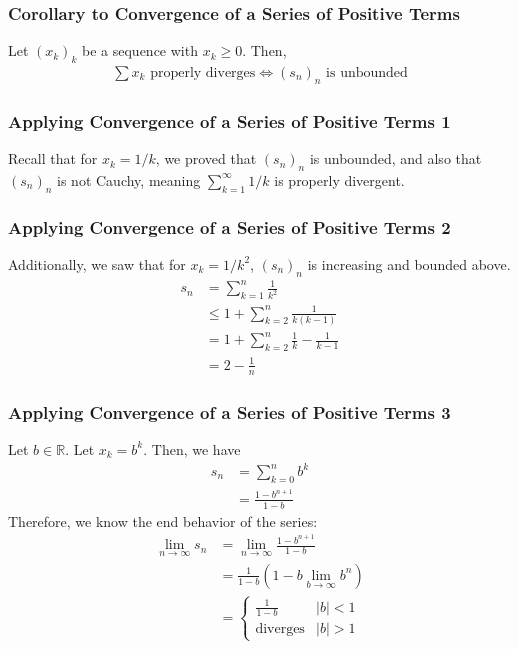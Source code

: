\documentclass[10pt]{extarticle}
\newcommand{\R}{\mathbb{R}}
\begin{document}
    \subsubsection{Corollary to Convergence of a Series of Positive Terms}%
      Let $(x_k)_k$ be a sequence with $x_k \geq 0$. Then,
      \begin{align*}
        \sum x_k \text{ properly diverges} \Leftrightarrow (s_n)_n \text{ is unbounded}
      \end{align*}
    \subsubsection{Applying Convergence of a Series of Positive Terms 1}%
      Recall that for $x_k = 1/k$, we proved that $(s_n)_n$ is unbounded, and also that $(s_n)_n$ is not Cauchy, meaning $\sum_{k=1}^{\infty}1/k$ is properly divergent.\\
    \subsubsection{Applying Convergence of a Series of Positive Terms 2}%
      Additionally, we saw that for $x_k = 1/k^2$, $(s_n)_n$ is increasing and bounded above.
      \begin{align*}
        s_n &= \sum_{k=1}^{n}\frac{1}{k^2}\\
            &\leq 1 + \sum_{k=2}^{n}\frac{1}{k(k-1)}\\
            &= 1 + \sum_{k=2}^{n}\frac{1}{k} - \frac{1}{k-1}\\
            &= 2 - \frac{1}{n}
      \end{align*}
    \subsubsection{Applying Convergence of a Series of Positive Terms 3}%
      Let $b\in\R$. Let $x_k = b^k$. Then, we have
      \begin{align*}
        s_n &= \sum_{k=0}^{n}b^k\\
            &= \frac{1-b^{n+1}}{1-b} \tag*{$b\neq 1$}
      \end{align*}
      Therefore, we know the end behavior of the series:
      \begin{align*}
        \lim_{n\rightarrow\infty} s_n &= \lim_{n\rightarrow\infty} \frac{1-b^{n+1}}{1-b}\\
                                      &= \frac{1}{1-b} \left(1-b\lim_{b\rightarrow\infty}b^{n}\right)\\
                                      &= \begin{cases}
                                        \frac{1}{1-b} & |b| < 1\\
                                        \text{diverges} & |b| > 1
                                      \end{cases}
      \end{align*}
\end{document}
